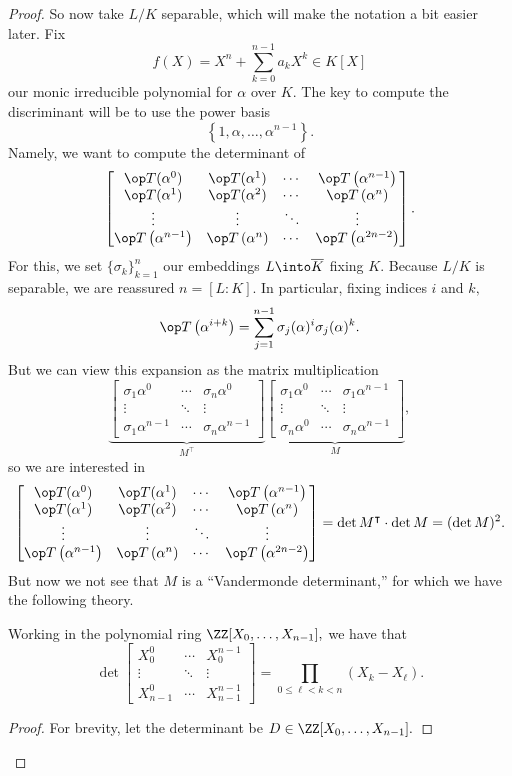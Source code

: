 \begin{proof}
	So now take $L/K$ separable, which will make the notation a bit easier later. Fix
	\[f(X)=X^n+\sum_{k=0}^{n-1}a_kX^k\in K[X]\]
	our monic irreducible polynomial for $\alpha$ over $K.$ The key to compute the discriminant will be to use the power basis
	\[\left\{1,\alpha,\ldots,\alpha^{n-1}\right\}.\]
	Namely, we want to compute the determinant of
	\[\begin{bmatrix}
		\op T(\alpha^0) & \op T(\alpha^1) & \cdots & \op T\left(\alpha^{n-1}\right) \\
		\op T(\alpha^1) & \op T(\alpha^2) & \cdots & \op T\left(\alpha^n\right)\\
		\vdots & \vdots & \ddots & \vdots \\
		\op T\left(\alpha^{n-1}\right) & \op T\left(\alpha^n\right) & \cdots & \op T\left(\alpha^{2n-2}\right)
	\end{bmatrix}.\]
	For this, we set $\{\sigma_k\}_{k=1}^n$ our embeddings $L\into\overline K$ fixing $K.$ Because $L/K$ is separable, we are reassured $n=[L:K].$ In particular, fixing indices $i$ and $k,$
	\[\op T\left(\alpha^{i+k}\right)=\sum_{j=1}^{n-1}\sigma_j(\alpha)^i\sigma_j(\alpha)^k.\]
	But we can view this expansion as the matrix multiplication
	\[\underbrace{\begin{bmatrix}
		\sigma_1\alpha^0 & \cdots & \sigma_n\alpha^0 \\
		\vdots & \ddots & \vdots \\
		\sigma_1\alpha^{n-1} & \cdots & \sigma_n\alpha^{n-1}
	\end{bmatrix}}_{M^\intercal}\underbrace{\begin{bmatrix}
		\sigma_1\alpha^0 & \cdots & \sigma_1\alpha^{n-1} \\
		\vdots & \ddots & \vdots \\
		\sigma_n\alpha^0 & \cdots & \sigma_n\alpha^{n-1}
	\end{bmatrix}}_M,\]
	so we are interested in
	\[\begin{bmatrix}
		\op T(\alpha^0) & \op T(\alpha^1) & \cdots & \op T\left(\alpha^{n-1}\right) \\
		\op T(\alpha^1) & \op T(\alpha^2) & \cdots & \op T\left(\alpha^n\right)\\
		\vdots & \vdots & \ddots & \vdots \\
		\op T\left(\alpha^{n-1}\right) & \op T\left(\alpha^n\right) & \cdots & \op T\left(\alpha^{2n-2}\right)
	\end{bmatrix}=\det M^\intercal\cdot\det M=(\det M)^2.\]
	But now we not see that $M$ is a ``Vandermonde determinant,'' for which we have the following theory.
	\begin{lemma} \label{lem:vandermonde}
		Working in the polynomial ring $\ZZ[X_0,\ldots,X_{n-1}],$ we have that
		\[\det\begin{bmatrix}
			X_0^0 & \cdots & X_0^{n-1} \\
			\vdots & \ddots & \vdots \\
			X_{n-1}^0 & \cdots & X_{n-1}^{n-1}
		\end{bmatrix}=\prod_{0\le \ell<k<n}(X_k-X_\ell).\]
	\end{lemma}
	\begin{proof}
		For brevity, let the determinant be $D\in\ZZ[X_0,\ldots,X_{n-1}].$
		

\end{proof}
\end{proof}
